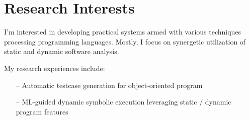 \section{Research Interests}
I'm interested in developing practical systems armed with various techniques processing programming languages. Mostly, I focus on synergetic utilization of static and dynamic software analysis.
\vspace{1mm}

\renewcommand{\labelitemi}{$\blacktriangleright$}
\addtolength{\leftmargini}{0.1cm}

My research experiences include:

\begin{itemize}
\item[--] Automatic testcase generation for object-oriented program
\vspace{1mm}
\item[--] ML-guided dynamic symbolic execution leveraging static / dynamic program features
\end{itemize}

\vspace{9mm}
